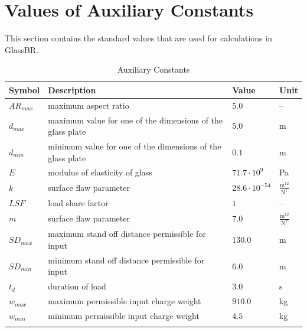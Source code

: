 \documentclass[12pt]{article}
\begin{document}
\section{Values of Auxiliary Constants}
\label{Sec:AuxConstants}
This section contains the standard values that are used for calculations in GlassBR.
\begin{longtabu}{l X[l] l l}
\toprule
\textbf{Symbol} & \textbf{Description} & \textbf{Value} & \textbf{Unit}
\\
\midrule
\endhead
${AR_{max}}$ & maximum aspect ratio & $5.0$ & --
\\
${d_{max}}$ & maximum value for one of the dimensions of the glass plate & $5.0$ & m
\\
${d_{min}}$ & minimum value for one of the dimensions of the glass plate & $0.1$ & m
\\
$E$ & modulus of elasticity of glass & $71.7\cdot{}10^{9}$ & Pa
\\
$k$ & surface flaw parameter & $28.6\cdot{}10^{-54}$ & $\frac{\text{m}^{12}}{\text{N}^{7}}$
\\
$LSF$ & load share factor & $1$ & --
\\
$m$ & surface flaw parameter & $7.0$ & $\frac{\text{m}^{12}}{\text{N}^{7}}$
\\
${SD_{max}}$ & maximum stand off distance permissible for input & $130.0$ & m
\\
${SD_{min}}$ & minimum stand off distance permissible for input & $6.0$ & m
\\
${t_{d}}$ & duration of load & $3.0$ & s
\\
${w_{max}}$ & maximum permissible input charge weight & $910.0$ & kg
\\
${w_{min}}$ & minimum permissible input charge weight & $4.5$ & kg
\\
\bottomrule
\caption{Auxiliary Constants}
\label{Table:TAuxConsts}
\end{longtabu}
\end{document}
